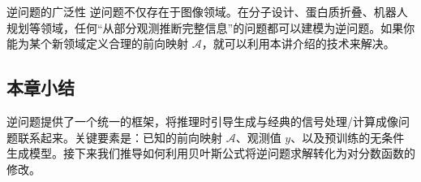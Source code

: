 \begin{knowledgebox}{逆问题的广泛性}
逆问题不仅存在于图像领域。在分子设计、蛋白质折叠、机器人规划等领域，任何``从部分观测推断完整信息''的问题都可以建模为逆问题。如果你能为某个新领域定义合理的前向映射 $\mathcal{A}$，就可以利用本讲介绍的技术来解决。
\end{knowledgebox}

\subsection{本章小结}

逆问题提供了一个统一的框架，将推理时引导生成与经典的信号处理/计算成像问题联系起来。关键要素是：已知的前向映射 $\mathcal{A}$、观测值 $y$、以及预训练的无条件生成模型。接下来我们推导如何利用贝叶斯公式将逆问题求解转化为对分数函数的修改。


